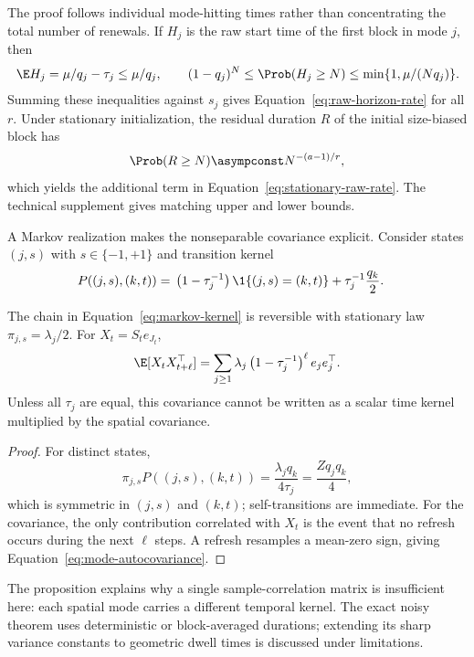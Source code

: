 The proof follows individual mode-hitting times rather than concentrating the
total number of renewals.  If $H_j$ is the raw start time of the first block in
mode $j$, then
\begin{equation}
\E H_j=\mu/q_j-\tau_j\le\mu/q_j,
\qquad
(1-q_j)^N\le\Prob(H_j\ge N)
\le\min\{1,\mu/(Nq_j)\}.
\label{eq:hitting-summary}
\end{equation}
Summing these inequalities against $s_j$ gives
Equation~\eqref{eq:raw-horizon-rate} for all $r$.  Under stationary
initialization, the residual duration $R$ of the initial size-biased block has
\begin{equation}
\Prob(R\ge N)\asympconst N^{-(a-1)/r},
\label{eq:inspection-tail-main}
\end{equation}
which yields the additional term in Equation~\eqref{eq:stationary-raw-rate}.
The technical supplement gives matching upper and lower bounds.

A Markov realization makes the nonseparable covariance explicit. Consider
states $(j,s)$ with $s\in\{-1,+1\}$ and transition kernel
\begin{align}
P((j,s),(k,t))
={}&\left(1-\tau_j^{-1}\right)
\1\{(j,s)=(k,t)\}
+\tau_j^{-1}\frac{q_k}{2}.
\label{eq:markov-kernel}
\end{align}

\begin{proposition}
\label{prop:markov}
The chain in Equation~\eqref{eq:markov-kernel} is reversible with stationary
law $\pi_{j,s}=\lambda_j/2$. For $X_t=S_te_{J_t}$,
\begin{equation}
\E[X_tX_{t+\ell}^\top]
=\sum_{j\ge1}\lambda_j
\left(1-\tau_j^{-1}\right)^\ell e_je_j^\top.
\label{eq:mode-autocovariance}
\end{equation}
Unless all $\tau_j$ are equal, this covariance cannot be written as a scalar
time kernel multiplied by the spatial covariance.
\end{proposition}

\begin{proof}
For distinct states,
\[
\pi_{j,s}P((j,s),(k,t))
=\frac{\lambda_jq_k}{4\tau_j}
=\frac{Zq_jq_k}{4},
\]
which is symmetric in $(j,s)$ and $(k,t)$; self-transitions are immediate.
For the covariance, the only contribution correlated with $X_t$ is the event
that no refresh occurs during the next $\ell$ steps. A refresh resamples a
mean-zero sign, giving Equation~\eqref{eq:mode-autocovariance}.
\end{proof}

The proposition explains why a single sample-correlation matrix is
insufficient here: each spatial mode carries a different temporal kernel.
The exact noisy theorem uses deterministic or block-averaged durations;
extending its sharp variance constants to geometric dwell times is discussed
under limitations.

